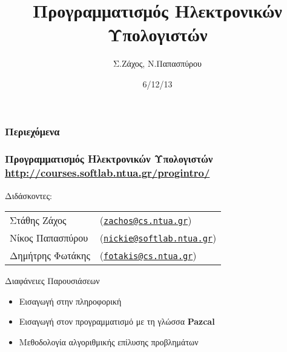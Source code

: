 \documentclass{beamer}
\title[Προγραμματισμός Ηλεκτρονικών Υπολογιστών]{Προγραμματισμός Ηλεκτρονικών Υπολογιστών}
\author[Σ.Ζάχος, Ν.Παπασπύρου]{Σ.Ζάχος, Ν.Παπασπύρου}
\date[12/13]{6/12/13}
\begin{document}
\begin{frame}
	\titlepage
\end{frame}

\begin{frame}
  \frametitle{Περιεχόμενα}
    \tableofcontents%
\end{frame}

\begin{frame}
	\frametitle{Προγραμματισμός Ηλεκτρονικών Υπολογιστών\\
		\url{http://courses.softlab.ntua.gr/progintro/}}

	Διδάσκοντες:
	\begin{tabular}{ll}
	  Στάθης Ζάχος & (\href{mailto:zachos@cs.ntua.gr}{\nolinkurl{zachos@cs.ntua.gr}}) \\
	  Νίκος Παπασπύρου & (\href{mailto:nickie@softlab.ntua.gr}{\nolinkurl{nickie@softlab.ntua.gr}}) \\
	  Δημήτρης Φωτάκης & (\href{mailto:fotakis@cs.ntua.gr}{\nolinkurl{fotakis@cs.ntua.gr}})
	\end{tabular}
	\vskip20pt

	\begin{center}{\large Διαφάνειες Παρουσιάσεων}\end{center}
	\begin{itemize}
	  \item[\checkmark] Εισαγωγή στην πληροφορική
		\item[\checkmark] Εισαγωγή στον προγραμματισμό με τη γλώσσα
			\textbf{{\color{officegreen}Pa{\color{red}z}cal}}
	  \item[\checkmark] Μεθοδολογία αλγοριθμικής επίλυσης προβλημάτων
	\end{itemize}
\end{frame}

\end{document}
